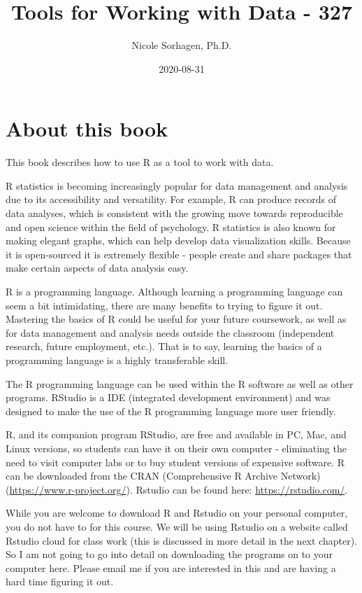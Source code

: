 \documentclass[
]{book}
\title{Tools for Working with Data - 327}
\author{Nicole Sorhagen, Ph.D.}
\date{2020-08-31}
\begin{document}
\maketitle

{
\setcounter{tocdepth}{1}
\tableofcontents
}
\hypertarget{about-this-book}{%
\chapter{About this book}\label{about-this-book}}

This book describes how to use R as a tool to work with data.

R statistics is becoming increasingly popular for data management and analysis due to its accessibility and versatility. For example, R can produce records of data analyses, which is consistent with the growing move towards reproducible and open science within the field of psychology. R statistics is also known for making elegant graphs, which can help develop data visualization skills. Because it is open-sourced it is extremely flexible - people create and share packages that make certain aspects of data analysis easy.

R is a programming language. Although learning a programming language can seem a bit intimidating, there are many benefits to trying to figure it out. Mastering the basics of R could be useful for your future coursework, as well as for data management and analysis needs outside the classroom (independent research, future employment, etc.). That is to say, learning the basics of a programming language is a highly transferable skill.

The R programming language can be used within the R software as well as other programs. RStudio is a IDE (integrated development environment) and was designed to make the use of the R programming language more user friendly.

R, and its companion program RStudio, are free and available in PC, Mac, and Linux versions, so students can have it on their own computer - eliminating the need to visit computer labs or to buy student versions of expensive software. R can be downloaded from the CRAN (Comprehensive R Archive Network) (\url{https://www.r-project.org/}). Rstudio can be found here: \url{https://rstudio.com/}.

While you are welcome to download R and Rstudio on your personal computer, you do not have to for this course. We will be using Rstudio on a website called Rstudio cloud for class work (this is discussed in more detail in the next chapter). So I am not going to go into detail on downloading the programs on to your computer here. Please email me if you are interested in this and are having a hard time figuring it out.
\end{document}
